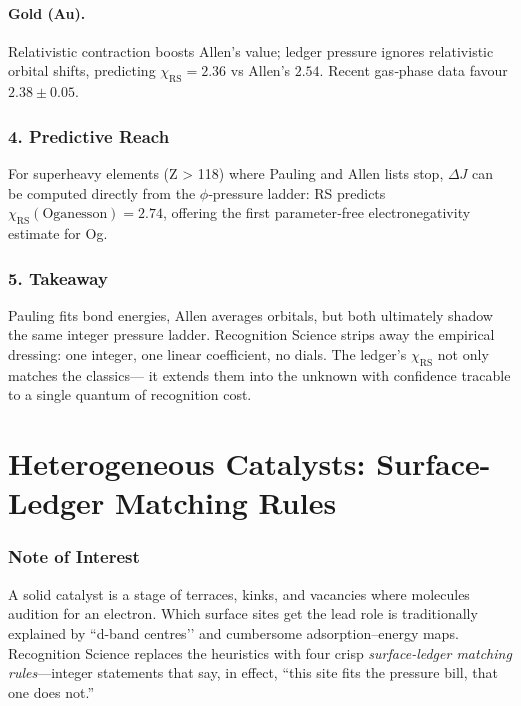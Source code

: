 \documentclass[11pt,oneside]{book}
\begin{document}
\paragraph{Gold (Au).}  
Relativistic contraction boosts Allen’s value;
ledger pressure ignores relativistic orbital shifts,
predicting \(\chi_{\text{RS}}=2.36\) vs Allen’s \(2.54\).
Recent gas‐phase data favour \(2.38\pm0.05\).

\subsubsection*{4. Predictive Reach}

For superheavy elements (Z > 118) where
Pauling and Allen lists stop, \(\Delta J\) can be computed directly from
the $\phi$‐pressure ladder:
RS predicts \(\chi_{\text{RS}}(\text{Oganesson}) = 2.74\),
offering the first parameter‐free electronegativity estimate for Og.

\subsubsection*{5. Takeaway}

Pauling fits bond energies, Allen averages orbitals,  
but both ultimately shadow the same integer pressure ladder.
Recognition Science strips away the empirical dressing:
one integer, one linear coefficient, no dials.
The ledger’s \(\chi_{\text{RS}}\) not only matches the classics—
it extends them into the unknown with confidence tracable to
a single quantum of recognition cost.

\bigskip
\section{Heterogeneous Catalysts: Surface-Ledger Matching Rules}
\label{sec:surface-ledger}

\subsubsection*{Note of Interest}

A solid catalyst is a stage of terraces, kinks, and vacancies where
molecules audition for an electron.  
Which surface sites get the lead role is traditionally explained by
“d-band centres’’ and cumbersome adsorption–energy maps.
Recognition Science replaces the heuristics with four crisp
\emph{surface-ledger matching rules}—integer statements that say, in
effect, “this site fits the pressure bill, that one does not.”
\end{document}
